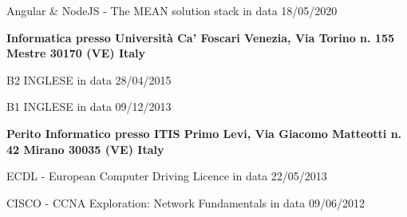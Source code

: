 
\begin{scholarship}
    {Angular \& NodeJS - The MEAN solution stack in data 18/05/2020}

    {\textbf{Informatica presso Università Ca' Foscari Venezia, Via Torino n. 155 Mestre 30170 (VE) Italy}}

    {B2 INGLESE in data 28/04/2015}

    {B1 INGLESE in data 09/12/2013}

    {\textbf{Perito Informatico presso ITIS Primo Levi, Via Giacomo Matteotti n. 42 Mirano 30035 (VE) Italy}}

    {ECDL - European Computer Driving Licence in data 22/05/2013}

    {CISCO - CCNA Exploration: Network Fundamentals in data 09/06/2012}
\end{scholarship}
